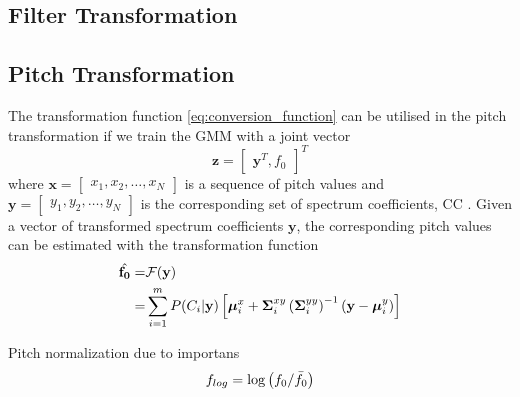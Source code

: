 \subsection{Filter Transformation} %
\label{sub:filter_transformation}

\subsection{Pitch Transformation} %
\label{sub:pitch_transformation}



The transformation function \eqref{eq:conversion_function} can be utilised in the pitch transformation if we train the GMM with a joint vector
\begin{equation}
	\mathbf{z} = \begin{bmatrix}
		{\mathbf{y}^T,f_0}
	\end{bmatrix}^T 
\end{equation}
where $\mathbf{x} = \begin{bmatrix}x_1,x_2,\dotsc,x_N \end{bmatrix}$ is a sequence of pitch values and $\mathbf{y} = \begin{bmatrix}y_1,y_2,\dotsc,y_N \end{bmatrix}$ is the corresponding set of spectrum coefficients, \eg CC \cite{najjary03new}. Given a vector of transformed spectrum coefficients $\mathbf{y}$, the corresponding pitch values can be estimated with the transformation function 
\begin{equation}
	\label{eq:pitch_transformation}
	\begin{split}
		\hat{\mathbf{f_0}} =& \mathcal F(\mathbf{y})\\
		=& \sum_{i=1}^{m}P(C_i \vert \mathbf{y}) \left[\boldsymbol{\mu}_i^x + \mathbf{\Sigma}_i^{xy} \left(\mathbf{\Sigma}_i^{yy}\right)^{-1} (\mathbf{y}-\boldsymbol{\mu}_i^y)\right]
	\end{split}
\end{equation}

Pitch normalization due to importans
\begin{equation}
	f_{log} = \log \left(f_0/\bar{f_0}\right)
\end{equation}








